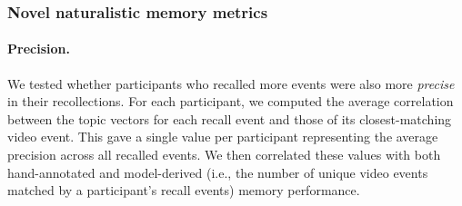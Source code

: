 \documentclass{article}
\begin{document}

\subsubsection*{Novel naturalistic memory metrics}

\paragraph*{Precision.}
We tested whether participants who recalled more events were also more \textit{precise} in their recollections. For each participant, we computed the average correlation between the topic vectors for each recall event and those of its closest-matching video event. This gave a single value per participant representing the average precision across all recalled events.  We then correlated these values with both hand-annotated and model-derived (i.e., the number of unique video events matched by a participant's recall events) memory performance.
\end{document}
